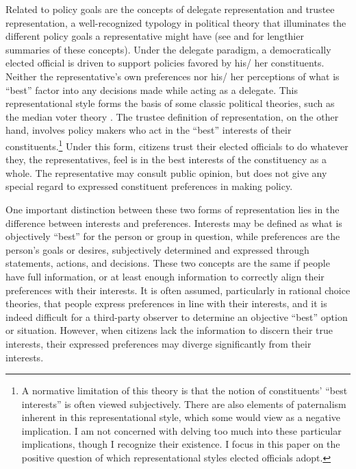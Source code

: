 Related to policy goals are the concepts of delegate representation and trustee representation, a well-recognized typology in political theory that illuminates the different policy goals a representative might have (see \citealt{Miller1963} and \citealt[][ch.~1]{Soroka2010} for lengthier summaries of these concepts). Under the delegate paradigm, a democratically elected official is driven to support policies favored by his/ her constituents. Neither the representative's own preferences nor his/ her perceptions of what is ``best'' factor into any decisions made while acting as a delegate. This representational style forms the basis of some classic political theories, such as the median voter theory \citep{Downs1957}. The trustee definition of representation, on the other hand, involves policy makers who act in the ``best'' interests  of their constituents.\footnote{A normative limitation of this theory is that the notion of constituents' ``best interests'' is often viewed subjectively. There are also elements of paternalism inherent in this representational style, which some would view as a negative implication. I am not concerned with delving too much into these particular implications, though I recognize their existence. I focus in this paper on the positive question of which representational styles elected officials adopt.} Under this form, citizens trust their elected officials to do whatever they, the representatives, feel is in the best interests of the constituency as a whole. The representative may consult public opinion, but does not give any special regard to expressed constituent preferences in making policy.

One important distinction between these two forms of representation lies in the difference between interests and preferences. Interests may be defined as what is objectively ``best'' for the person or group in question, while preferences are the person's goals or desires, subjectively determined and expressed through statements, actions, and decisions. These two concepts are the same if people have full information, or at least enough information to correctly align their preferences with their interests. It is often assumed, particularly in rational choice theories, that people express preferences in line with their interests, and it is indeed difficult for a third-party observer to determine an objective ``best'' option or situation. However, when citizens lack the information to discern their true interests, their expressed preferences may diverge significantly from their interests.

